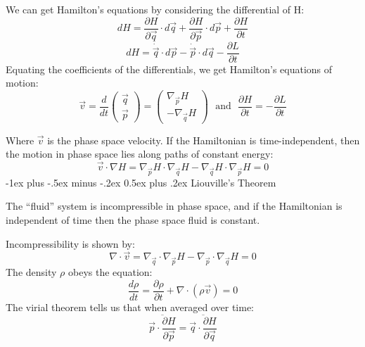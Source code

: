 \documentclass[10pt,landscape]{article}
\makeatletter
\renewcommand{\section}{\@startsection{section}{1}{0mm}%
                                {-1ex plus -.5ex minus -.2ex}%
                                {0.5ex plus .2ex}%
                                {\normalfont\large\bfseries}}
\makeatother
\begin{document}
\begin{multicols}{3}
We can get Hamilton's equations by considering the differential of H:
\begin{equation}
	dH = \frac{\partial H}{\partial \vec{q}}\cdot d\vec{q} + \frac{\partial H}{\partial \vec{p}}\cdot d\vec{p} + \frac{\partial H}{\partial t}
\end{equation}
\begin{equation}
	dH = \dot{\vec q} \cdot d\vec{p} - \dot{\vec p} \cdot d\vec{q} - \frac{\partial L}{\partial t}
\end{equation}
Equating the coefficients of the differentials, we get Hamilton's equations of motion:
\begin{equation}
	\vec v =
	\frac{d}{dt}
	\begin{pmatrix}
		\vec{q} \\
		\vec{p}
		\end{pmatrix} = 
		\begin{pmatrix}
			\nabla_{\vec{p}}H \\ 
			-\nabla_{\vec{q}}H
		\end{pmatrix}\mathrm{\ \ \ and\ \ \ } \frac{\partial H}{\partial t} = -\frac{\partial L}{\partial t}
\end{equation}

Where $\vec v$ is the phase space velocity. If the Hamiltonian is time-independent, then the motion in phase space lies along paths of constant energy:
\begin{equation}
	\vec {v}\cdot \nabla H = \nabla_{\vec{p}}H\cdot\nabla_{\vec{q}} H - \nabla_{\vec{q}}H\cdot\nabla_{\vec{p}} H = 0
\end{equation}
\section{Liouville's Theorem}

The ``fluid'' system is incompressible in phase space, and if the Hamiltonian is independent of time then the phase space fluid is constant.

Incompressibility is shown by:
\begin{equation}
	\nabla \cdot\vec{v} = \nabla_{\vec{q}}\cdot\nabla_{\vec{p}}H - \nabla_{\vec{p}}\cdot\nabla_{\vec{q}} H = 0
\end{equation}
The density $\rho$ obeys the equation:
\begin{equation}
	\frac{d\rho}{dt} = \frac{\partial \rho}{\partial t} + \nabla \cdot (\rho \vec{v}) = 0
\end{equation}
The virial theorem tells us that when averaged over time:
\begin{equation}
	\overline{\vec{p}\cdot\frac{\partial H}{\partial \vec{p}}} = \overline{\vec{q}\cdot \frac{\partial H}{\partial \vec{q}}}
\end{equation}

\end{multicols}
\end{document}
